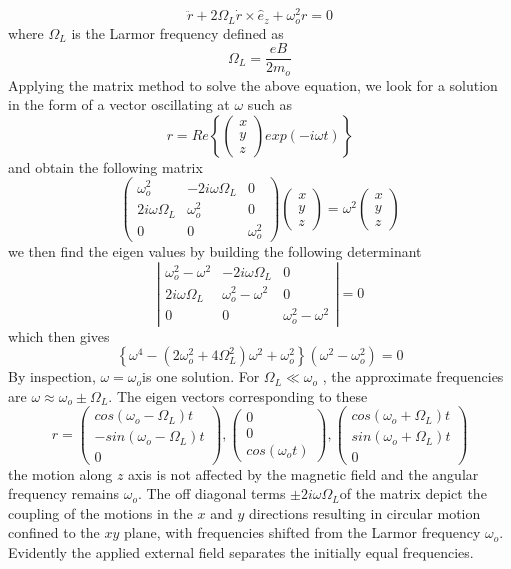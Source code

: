 \[
\ddot{r}+2\Omega_{L}\dot{r}\times\hat{e}_{z}+\omega_{o}^{2}r=0
\]
 where $\Omega_{L}$ is the Larmor frequency defined as
\[
\Omega_{L}=\frac{eB}{2m_{o}}
\]
 Applying the matrix method to solve the above equation, we look for
a solution in the form of a vector oscillating at $\omega$ such as
\[
r=Re\left\{ \left(\begin{array}{c}
x\\
y\\
z
\end{array}\right)exp(-i\omega t)\right\} 
\]
 and obtain the following matrix
\[
\left(\begin{array}{ccc}
\omega_{o}^{2} & -2i\omega\Omega_{L} & 0\\
2i\omega\Omega_{L} & \omega_{o}^{2} & 0\\
0 & 0 & \omega_{o}^{2}
\end{array}\right)\left(\begin{array}{c}
x\\
y\\
z
\end{array}\right)=\omega^{2}\left(\begin{array}{c}
x\\
y\\
z
\end{array}\right)
\]
 we then find the eigen values by building the following determinant
\[
\left|\begin{array}{ccc}
\omega_{o}^{2}-\omega^{2} & -2i\omega\Omega_{L} & 0\\
2i\omega\Omega_{L} & \omega_{o}^{2}-\omega^{2} & 0\\
0 & 0 & \omega_{o}^{2}-\omega^{2}
\end{array}\right|=0
\]
 which then gives 
\[
\left\{ \omega^{4}-\left(2\omega_{o}^{2}+4\Omega_{L}^{2}\right)\omega^{2}+\omega_{o}^{2}\right\} \left(\omega^{2}-\omega_{o}^{2}\right)=0
\]
By inspection, $\omega=\omega_{o}$is one solution. For $\Omega_{L}\ll\omega_{o}$
, the approximate frequencies are $\omega\approx\omega_{o}\pm\Omega_{L}$.
The eigen vectors corresponding to these
\[
r=\left(\begin{array}{c}
cos(\omega_{o}-\Omega_{L})t\\
-sin(\omega_{o}-\Omega_{L})t\\
0
\end{array}\right),\left(\begin{array}{c}
0\\
0\\
cos(\omega_{o}t)
\end{array}\right),\left(\begin{array}{c}
cos(\omega_{o}+\Omega_{L})t\\
sin(\omega_{o}+\Omega_{L})t\\
0
\end{array}\right)
\]
 the motion along $z$ axis is not affected by the magnetic field
and the angular frequency remains $\omega_{o}$. The off diagonal
terms $\pm2i\omega\Omega_{L}$of the matrix depict the coupling of
the motions in the $x$ and $y$ directions resulting in circular
motion confined to the $xy$ plane, with frequencies shifted from
the Larmor frequency $\omega_{o}$. Evidently the applied external
field separates the initially equal frequencies.


